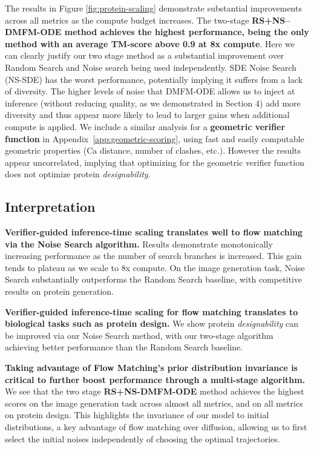 \documentclass{article} %
\begin{document}
The results in Figure \ref{fig:protein-scaling} demonstrate substantial improvements across all metrics as the compute budget increases. The two-stage \textbf{RS+NS–DMFM-ODE method achieves the highest performance, being the only method with an average TM-score above 0.9 at 8x compute}. Here we can clearly justify our two stage method as a substantial improvement over Random Search and Noise search being used independently. SDE Noise Search (NS-SDE) has the worst performance, potentially implying it suffers from a lack of diversity. The higher levels of noise that DMFM-ODE allows us to inject at inference (without reducing quality, as we demonstrated in Section 4) add more diversity and thus appear more likely to lead to larger gains when additional compute is applied. We include a similar analysis for a \textbf{geometric verifier function} in Appendix~\ref{app:geometric-scoring}, using fast and easily computable geometric properties (Ca distance, number of clashes, etc.). However the results appear uncorrelated, implying that optimizing for the geometric verifier function does not optimize protein \textit{designability}.

\subsection{Interpretation}
\textbf{Verifier-guided inference-time scaling translates well to flow matching via the Noise Search algorithm.} Results demonstrate monotonically increasing performance as the number of search branches is increased. This gain tends to plateau as we scale to 8x compute. On the image generation task, Noise Search substantially outperforms the Random Search baseline, with competitive results on protein generation.

\textbf{Verifier-guided inference-time scaling for flow matching translates to biological tasks such as protein design.} We show protein \textit{designability} can be improved via our Noise Search method, with our two-stage algorithm achieving better performance than the Random Search baseline. 

\textbf{Taking advantage of Flow Matching's prior distribution invariance is critical to further boost performance through a multi-stage algorithm.} We see that the two stage \textbf{RS+NS-DMFM-ODE} method achieves the highest scores on the image generation task across almost all metrics, and on all metrics on protein design. This highlights the invariance of our model to initial distributions, a key advantage of flow matching over diffusion, allowing us to first select the initial noises independently of choosing the optimal trajectories.
\end{document}
